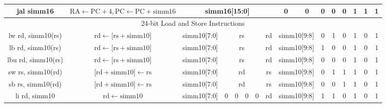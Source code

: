 \documentclass[a4paper,10pt]{article}
\begin{document}
\begin{landscape}
\begin{longtable}[c]{|c|c|@{}c@{}|@{}c@{}|@{}c@{}|@{}c@{}|@{}c@{}|@{}c@{}|@{}c@{}|@{}c@{}|@{}c@{}|@{}c@{}|@{}c@{}|@{}c@{}|@{}c@{}|@{}c@{}|@{}c@{}|@{}c@{}|@{}c@{}|@{}c@{}|@{}c@{}|@{}c@{}|@{}c@{}|@{}c@{}|@{}c@{}|@{}c@{}|}
jal simm16            & $\mathrm{RA} \leftarrow \mathrm{PC} + 4, \mathrm{PC} \leftarrow \mathrm{PC} + \mathrm{simm16}$ & \multicolumn{16}{c|}{simm16{[}15:0{]}}                                                                                         & 0              & 0              & 0 & 0   & 0   & 1 & 1 & 1 \\

\hline
\multicolumn{26}{|c|}{24-bit Load and Store Instructions}                                                                                                                                                                                                                                                             \\\hline
lw rd, simm10(rs)     & $\mathrm{rd} \leftarrow {[}\mathrm{rs} + \mathrm{simm10}{]}$ & \multicolumn{8}{c|}{simm10{[}7:0{]}}                        & \multicolumn{4}{c|}{rs}             & \multicolumn{4}{c|}{rd}      & \multicolumn{2}{c|}{simm10{[}9:8{]}} & 0   & 1   & 0   & 1 & 0 & 1 \\
lb rd, simm10(rs)     & $\mathrm{rd} \leftarrow {[}\mathrm{rs} + \mathrm{simm10}{]}$ & \multicolumn{8}{c|}{simm10{[}7:0{]}}                        & \multicolumn{4}{c|}{rs}             & \multicolumn{4}{c|}{rd}      & \multicolumn{2}{c|}{simm10{[}9:8{]}} & 1   & 0   & 0   & 1 & 0 & 1 \\
lbu rd, simm10(rs)    & $\mathrm{rd} \leftarrow {[}\mathrm{rs} + \mathrm{simm10}{]}$ & \multicolumn{8}{c|}{simm10{[}7:0{]}}                        & \multicolumn{4}{c|}{rs}             & \multicolumn{4}{c|}{rd}      & \multicolumn{2}{c|}{simm10{[}9:8{]}} & 0   & 0   & 0   & 1 & 0 & 1 \\
sw rs, simm10(rd)     & ${[}\mathrm{rd} + \mathrm{simm10}{]} \leftarrow \mathrm{rs}$ & \multicolumn{8}{c|}{simm10{[}7:0{]}}                        & \multicolumn{4}{c|}{rd}             & \multicolumn{4}{c|}{rs}      & \multicolumn{2}{c|}{simm10{[}9:8{]}} & 0 & 1   & 1   & 1 & 0 & 1 \\
sb rs, simm10(rd)     & ${[}\mathrm{rd} + \mathrm{simm10}{]} \leftarrow \mathrm{rs}$ & \multicolumn{8}{c|}{simm10{[}7:0{]}}                        & \multicolumn{4}{c|}{rd}             & \multicolumn{4}{c|}{rs}      & \multicolumn{2}{c|}{simm10{[}9:8{]}} & 0   & 0   & 1   & 1 & 0 & 1 \\
li rd, simm10         & $\mathrm{rd} \leftarrow \mathrm{simm10}$ & \multicolumn{8}{c|}{simm10{[}7:0{]}}                        & 0      & 0    & 0    & 0   & \multicolumn{4}{c|}{rd}      & \multicolumn{2}{c|}{simm10{[}9:8{]}} & 1   & 1   & 0   & 1 & 0 & 1 \\


\end{longtable}
\end{landscape}
\end{document}
